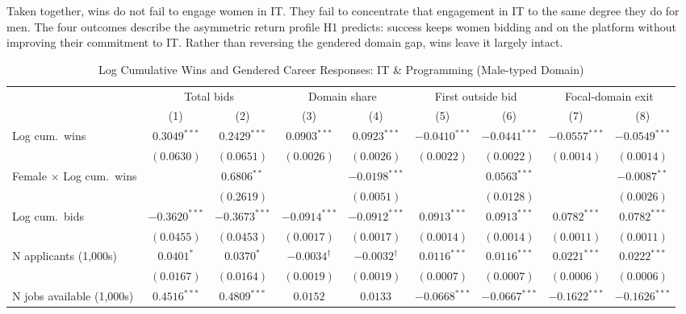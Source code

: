 \documentclass[12pt]{article}
\begin{document}
Taken together, wins do not fail to engage women in IT. They fail to concentrate that engagement in IT to the same degree they do for men.
The four outcomes describe the asymmetric return profile H1 predicts: success keeps women bidding and on the platform without improving their commitment to IT. Rather than reversing the gendered domain gap, wins leave it largely intact.

\begin{table}
\centering
\def\sym#1{\ifmmode^{#1}\else\(^{#1}\)\fi}
\caption{Log Cumulative Wins and Gendered Career Responses: IT \& Programming (Male-typed Domain)}
\label{tab:table2}
\small
\begin{tabular}{lcccccccc}
\hline\hline
  & \multicolumn{2}{c}{Total bids} & \multicolumn{2}{c}{Domain share} & \multicolumn{2}{c}{First outside bid} & \multicolumn{2}{c}{Focal-domain exit} \\
\cmidrule(lr){2-3}
\cmidrule(lr){4-5}
\cmidrule(lr){6-7}
\cmidrule(lr){8-9}
  & (1) & (2) & (3) & (4) & (5) & (6) & (7) & (8) \\
\hline
Log cum.\ wins & $0.3049^{***}$ & $0.2429^{***}$ & $0.0903^{***}$ & $0.0923^{***}$ & $-0.0410^{***}$ & $-0.0441^{***}$ & $-0.0557^{***}$ & $-0.0549^{***}$ \\
  & $(0.0630)$ & $(0.0651)$ & $(0.0026)$ & $(0.0026)$ & $(0.0022)$ & $(0.0022)$ & $(0.0014)$ & $(0.0014)$ \\[4pt]
Female $\times$ Log cum.\ wins &  & $0.6806^{**}$ &  & $-0.0198^{***}$ &  & $0.0563^{***}$ &  & $-0.0087^{**}$ \\
  &  & $(0.2619)$ &  & $(0.0051)$ &  & $(0.0128)$ &  & $(0.0026)$ \\[4pt]
Log cum.\ bids & $-0.3620^{***}$ & $-0.3673^{***}$ & $-0.0914^{***}$ & $-0.0912^{***}$ & $0.0913^{***}$ & $0.0913^{***}$ & $0.0782^{***}$ & $0.0782^{***}$ \\
  & $(0.0455)$ & $(0.0453)$ & $(0.0017)$ & $(0.0017)$ & $(0.0014)$ & $(0.0014)$ & $(0.0011)$ & $(0.0011)$ \\[4pt]
N applicants (1,000s) & $0.0401^{*}$ & $0.0370^{*}$ & $-0.0034^{\dagger}$ & $-0.0032^{\dagger}$ & $0.0116^{***}$ & $0.0116^{***}$ & $0.0221^{***}$ & $0.0222^{***}$ \\
  & $(0.0167)$ & $(0.0164)$ & $(0.0019)$ & $(0.0019)$ & $(0.0007)$ & $(0.0007)$ & $(0.0006)$ & $(0.0006)$ \\[4pt]
N jobs available (1,000s) & $0.4516^{***}$ & $0.4809^{***}$ & $0.0152$ & $0.0133$ & $-0.0668^{***}$ & $-0.0667^{***}$ & $-0.1622^{***}$ & $-0.1626^{***}$ \\

\end{tabular}
\end{table}
\end{document}

